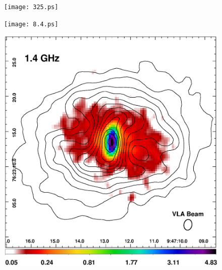 \begin{figure}
  \begin{center}
    \begin{minipage}{0.495\linewidth}
      \texttt{[image: 325.ps]}
    \end{minipage}
   \begin{minipage}{0.495\linewidth}
      \texttt{[image: 8.4.ps]}
   \end{minipage}
   \begin{minipage}{0.495\linewidth}
      \includegraphics*[width=\textwidth, trim=0mm 0mm 0mm 0mm, clip]{1.4.ps}
    \end{minipage}
    \begin{minipage}{0.495\linewidth}

\end{minipage}
\end{center}
\end{figure}
